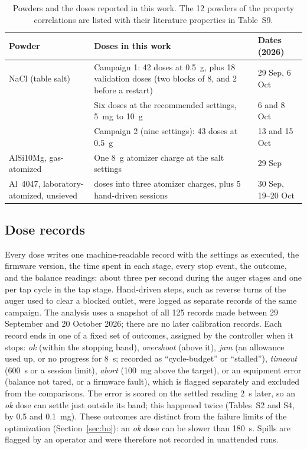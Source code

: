 \documentclass[preprint,12pt]{elsarticle}
\begin{document}
\begin{table}[t]
\centering
\caption{Powders and the doses reported in this work. The 12 powders of the property correlations are listed with their literature properties in Table~S9.}
\label{tab:powders}
\small
\begin{tabularx}{\linewidth}{@{}>{\raggedright\arraybackslash}p{3.3cm}>{\raggedright\arraybackslash}Xl@{}}
\toprule
Powder & Doses in this work & Dates (2026) \\
\midrule
NaCl (table salt) & Campaign 1: 42 doses at 0.5~g, plus 18 validation doses (two blocks of 8, and 2 before a restart) & 29 Sep, 6 Oct \\
 & Six doses at the recommended settings, 5~mg to 10~g & 6 and 8 Oct \\
 & Campaign 2 (nine settings): 43 doses at 0.5~g & 13 and 15 Oct \\
AlSi10Mg, gas-atomized & One 8~g atomizer charge at the salt settings & 29 Sep \\
Al~4047, laboratory-atomized, unsieved & 10 doses into three atomizer charges, plus 5 hand-driven sessions & 30 Sep, 19--20 Oct \\
\bottomrule
\end{tabularx}
\end{table}

\subsection{Dose records}
\label{sec:records}

Every dose writes one machine-readable record with the settings as executed, the firmware version, the time spent in each stage, every stop event, the outcome, and the balance readings: about three per second during the auger stages and one per tap cycle in the tap stage. Hand-driven steps, such as reverse turns of the auger used to clear a blocked outlet, were logged as separate records of the same campaign. The analysis uses a snapshot of all 125 records made between 29 September and 20 October 2026; there are no later calibration records. Each record ends in one of a fixed set of outcomes, assigned by the controller when it stops: \emph{ok} (within the stopping band), \emph{overshoot} (above it), \emph{jam} (an allowance used up, or no progress for 8~s; recorded as ``cycle-budget'' or ``stalled''), \emph{timeout} (600~s or a session limit), \emph{abort} (100~mg above the target), or an equipment error (balance not tared, or a firmware fault), which is flagged separately and excluded from the comparisons. The error is scored on the settled reading 2~s later, so an \emph{ok} dose can settle just outside its band; this happened twice (Tables~S2 and S4, by 0.5 and 0.1~mg). These outcomes are distinct from the failure limits of the optimization (Section~\ref{sec:bo}): an \emph{ok} dose can be slower than 180~s. Spills are flagged by an operator and were therefore not recorded in unattended runs.
\end{document}
